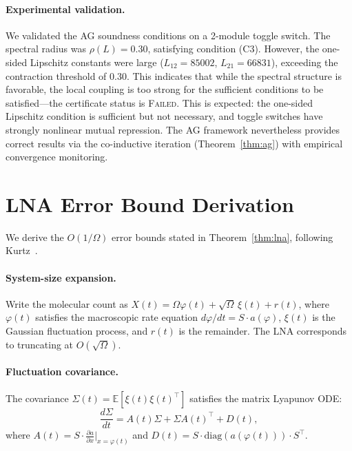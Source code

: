 \documentclass[11pt]{article}
\begin{document}
\paragraph{Experimental validation.}
We validated the AG soundness conditions on a 2-module toggle switch.
The spectral radius was $\rho(L) = 0.30$, satisfying condition (C3).
However, the one-sided Lipschitz constants were large
($L_{12} = 85002$, $L_{21} = 66831$), exceeding the contraction
threshold of 0.30. This indicates that while the spectral structure
is favorable, the local coupling is too strong for the sufficient
conditions to be satisfied---the certificate status is
\textsc{Failed}. This is expected: the one-sided Lipschitz condition
is sufficient but not necessary, and toggle switches have strongly
nonlinear mutual repression. The AG framework nevertheless provides
correct results via the co-inductive iteration
(Theorem~\ref{thm:ag}) with empirical convergence monitoring.

\section{LNA Error Bound Derivation}
\label{app:lna-derivation}

We derive the $O(1/\Omega)$ error bounds stated in
Theorem~\ref{thm:lna}, following
Kurtz~\cite{kurtz1972relationship}.

\paragraph{System-size expansion.}
Write the molecular count as $X(t) = \Omega \varphi(t) +
\sqrt{\Omega}\,\xi(t) + r(t)$, where $\varphi(t)$ satisfies the
macroscopic rate equation $d\varphi/dt = S \cdot a(\varphi)$,
$\xi(t)$ is the Gaussian fluctuation process, and $r(t)$ is the
remainder. The LNA corresponds to truncating at $O(\sqrt{\Omega})$.

\paragraph{Fluctuation covariance.}
The covariance $\Sigma(t) = \mathbb{E}[\xi(t)\xi(t)^\top]$
satisfies the matrix Lyapunov ODE:
\begin{equation}
\frac{d\Sigma}{dt} = A(t)\Sigma + \Sigma A(t)^\top + D(t),
\end{equation}
where $A(t) = S \cdot \frac{\partial a}{\partial x}\big|_{x=\varphi(t)}$
and $D(t) = S \cdot \text{diag}(a(\varphi(t))) \cdot S^\top$.
\end{document}
